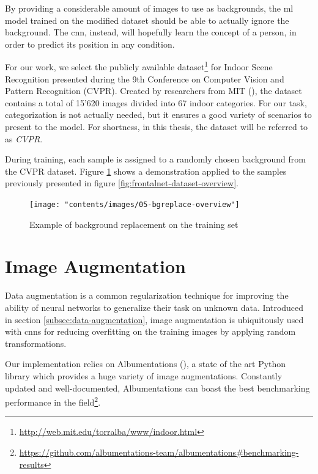 By providing a considerable amount of images to use as backgrounds, the \gls{ml} model trained on the modified dataset should be able to actually ignore the background. The \gls{cnn}, instead, will hopefully learn the concept of a person, in order to predict its position in any condition.

\medskip

For our work, we select the publicly available dataset\footnote{\url{http://web.mit.edu/torralba/www/indoor.html}} for Indoor Scene Recognition presented during the 9th Conference on Computer Vision and Pattern Recognition (CVPR). Created by researchers from MIT (\cite{cvpr09}), the dataset contains a total of 15'620 images divided into 67 indoor categories. For our task, categorization is not actually needed, but it ensures a good variety of scenarios to present to the model. For shortness, in this thesis, the dataset will be referred to as \textit{CVPR}.

During training, each sample is assigned to a randomly chosen background from the CVPR dataset. Figure \ref{fig:bgreplace-example} shows a demonstration applied to the samples previously presented in figure \ref{fig:frontalnet-dataset-overview}. 

\vspace*{5ex}
\begin{figure}[!h]
	\centering
	\texttt{[image: "contents/images/05-bgreplace-overview"]}
	\caption[Example of background replacement on the training set]{Example of background replacement on the training set}
	\label{fig:bgreplace-example}
\end{figure}
\clearpage




\section{Image Augmentation}
\label{sec:implementation-imgaug}

Data augmentation is a common regularization technique for improving the ability of neural networks to generalize their task on unknown data. Introduced in section \ref{subsec:data-augmentation}, image augmentation is ubiquitously used with \gls{cnn}s for reducing overfitting on the training images by applying random transformations.

Our implementation relies on Albumentations (\cite{Buslaev_2020}), a state of the art Python library which provides a huge variety of image augmentations. Constantly updated and well-documented, Albumentations can boast the best benchmarking performance in the field\footnote{\url{https://github.com/albumentations-team/albumentations\#benchmarking-results}}.

